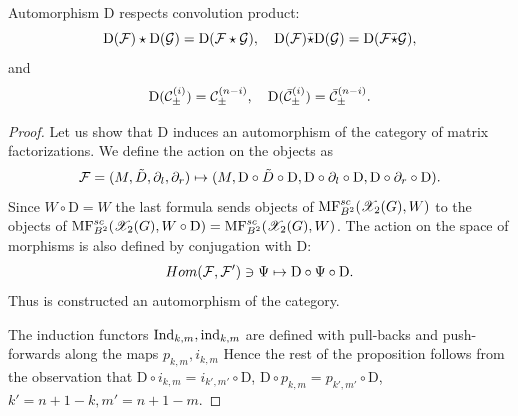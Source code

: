 \begin{proposition} Automorphism $\mathrm{D}$ respects convolution product:
$$\mathrm{D}(\mathcal{F})\star \mathrm{D}(\mathcal{G})=\mathrm{D}(\mathcal{F}\star\mathcal{G}),\quad \mathrm{D}(\mathcal{F})\bar{\star} \mathrm{D}(\mathcal{G})=\mathrm{D}(\mathcal{F}\bar{\star}\mathcal{G}),$$
and
$$ \mathrm{D}(\mathcal{C}^{(i)}_{\pm})=\mathcal{C}^{(n-i)}_{\pm},\quad \mathrm{D}(\bar{\mathcal{C}}^{(i)}_{\pm})=\bar{\mathcal{C}}^{(n-i)}_{\pm}.$$
\end{proposition}
\begin{proof}
  Let us show that \(\mathrm{D}\) induces an automorphism of the category of matrix factorizations. We define the action on the objects
  as
  \[\mathcal{F}=(M,\tilde{D},\partial_l,\partial_r)\mapsto (M,\mathrm{D}\circ \tilde{D}\circ \mathrm{ D},
    \mathrm{D}\circ \partial_l\circ \mathrm{D},\mathrm{D}\circ\partial_r\circ \mathrm{D}).\]
  Since \(W\circ \mathrm{D}=W\) the last formula sends objects of \(\mathrm{MF}^{sc}_{B^2}(\mathscr{X}_2(G),W)\) to the objects of \(\mathrm{MF}^{sc}_{B^2}(\mathscr{X}_2(G),W\circ\mathrm{D})=
  \mathrm{MF}^{sc}_{B^2}(\mathscr{X}_2(G),W)\). The action on the space of morphisms  is also defined by conjugation with \(\mathrm{D}\):
  \[ Hom(\mathcal{F},\mathcal{F}') \owns \Psi\mapsto \mathrm{D}\circ \Psi\circ \mathrm{D}.\]
  Thus is constructed an automorphism of the category.

  The induction functors \(\mathrm{Ind}_{k,m},\mathrm{ind}_{k,m}\) are defined with pull-backs and push-forwards along the maps \(p_{k,m},i_{k,m}\)
  Hence the rest of the proposition follows from the observation that \(\mathrm{D}\circ i_{k,m}= i_{k',m'}\circ \mathrm{D}\), \(
  \mathrm{D}\circ p_{k,m}= p_{k',m'}\circ \mathrm{D}\),
  \(k'=n+1-k,m'=n+1-m\).
\end{proof}

